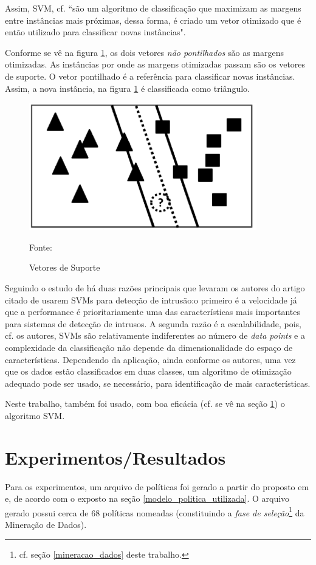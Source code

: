 Assim, SVM, cf. \cite[p. 45]{aprenda_mineracao_fernando_amaral16} ``são um algoritmo de classificação que maximizam as margens entre instâncias mais próximas, dessa forma, é criado um vetor otimizado que é então utilizado para classificar novas instâncias".

Conforme se vê na figura \ref{fig:svm}, os dois vetores \textit{não pontilhados} são as margens otimizadas. As instâncias por onde as margens otimizadas passam são os vetores de suporte. O vetor pontilhado é a referência para classificar novas instâncias. Assim, a nova instância, na figura \ref{fig:svm} é classificada como triângulo.

\begin{figure}[h!]
	\centering
	\includegraphics[width=.7\textwidth]{imagens/vetores_de_suporte.png}	
	\caption{Vetores de Suporte}
	\label{fig:svm}
	{\scriptsize 	Fonte: \cite[p. 45]{aprenda_mineracao_fernando_amaral16}}
\end{figure}

Seguindo o estudo de \cite{mukkamala_intrusion_2002} há duas razões principais que levaram os autores do artigo citado de usarem SVMs para detecção de intrusão:o primeiro é a velocidade já que a performance é prioritariamente uma das características mais importantes para sistemas de detecção de intrusos. A segunda razão é a escalabilidade, pois, cf. os autores, SVMs são relativamente indiferentes ao número de \textit{data points} e a complexidade da classificação não depende da dimensionalidade do espaço de características. Dependendo da aplicação, ainda conforme os autores, uma vez que os dados estão classificados em duas classes, um algoritmo de otimização adequado pode ser usado, se necessário,  para identificação de mais características.

Neste trabalho, também foi usado, com boa eficácia (cf. se vê na seção \ref{resultados}) o algoritmo SVM.

\chapter{Experimentos/Resultados}\label{resultados}
Para os experimentos, um arquivo de políticas foi gerado a partir do proposto em \cite{sarkis2017} e, de acordo com o exposto na seção \ref{modelo_politica_utilizada}. O arquivo gerado possui cerca de 68 políticas nomeadas (constituindo a \textit{fase de seleção}\footnote{cf. seção \ref{mineracao_dados} deste trabalho.} da Mineração de Dados). 

